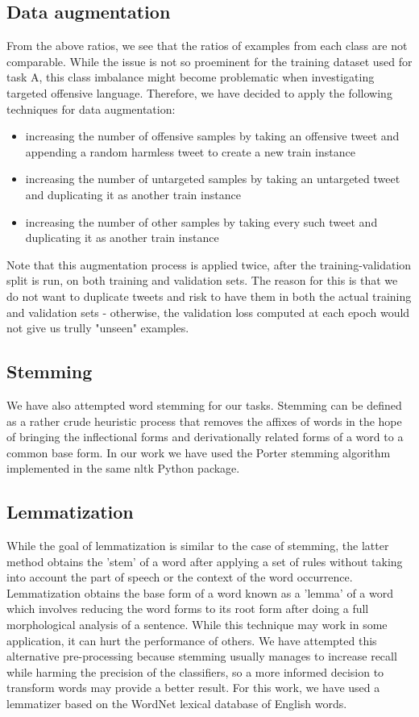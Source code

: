 \documentclass[11pt,a4paper]{article}
\begin{document}
\subsection{Data augmentation}

From the above ratios, we see that the ratios of examples from each class are not comparable. While the issue is not so proeminent for the training dataset used for task A, this class imbalance might become problematic when investigating targeted offensive language. Therefore, we have decided to apply the following techniques for data augmentation:
\begin{itemize}
    \item increasing the number of offensive samples by taking an offensive tweet and appending a random harmless tweet to create a new train instance
    \item increasing the number of untargeted samples by taking an untargeted tweet and duplicating it as another train instance
    \item increasing the number of other samples by taking every such tweet and duplicating it as another train instance
\end{itemize}

Note that this augmentation process is applied twice, after the training-validation split is run, on both training and validation sets. The reason for this is that we do not want to duplicate tweets and risk to have them in both the actual training and validation sets - otherwise, the validation loss computed at each epoch would not give us trully "unseen" examples.

\subsection{Stemming}

We have also attempted word stemming for our tasks. Stemming can be defined as a rather crude heuristic process that removes the affixes of words in the hope of bringing the inflectional forms and derivationally related forms of a word to a common base form. In our work we have used the Porter stemming algorithm implemented in the same nltk Python package.

\subsection{Lemmatization}

While the goal of lemmatization is similar to the case of stemming, the latter method obtains the 'stem' of a word after applying a set of rules without taking into account the part of speech or the context of the word occurrence. Lemmatization obtains the base form of a word known as a 'lemma' of a word which involves reducing the word forms to its root form after doing a full morphological analysis of a sentence. While this technique may work in some application, it can hurt the performance of others. We have attempted this alternative pre-processing because stemming usually manages to increase recall while harming the precision of the classifiers, so a more informed decision to transform words may provide a better result. For this work, we have used a lemmatizer based on the WordNet lexical database of English words.
\end{document}
